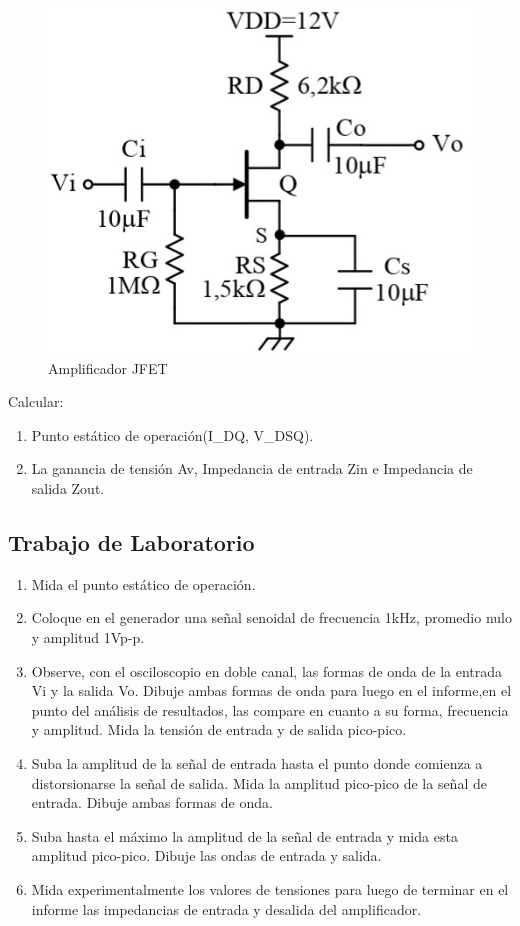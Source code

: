 \documentclass[12pt, a4paper]{article}
\begin{document}
    \begin{figure}[h!]
        \centering
        \includegraphics[height=5cm\textwidth]{amplificador.jpg}
        \caption{Amplificador JFET}
        \label{fig:amp}
    \end{figure}

    Calcular:

    \begin{enumerate}
        \item \label{p11}	Punto estático de operación(I_{DQ}, V_{DSQ}).
        \item \label{p12}	La ganancia de tensión Av, Impedancia de entrada Zin e Impedancia de salida Zout.
    \end{enumerate}

    \subsection{Trabajo de Laboratorio}

    \begin{enumerate}
        \item \label{p21}   Mida el punto estático de operación.
        \item \label{p22}	Coloque en el generador una señal senoidal de frecuencia 1kHz, promedio nulo y amplitud 1Vp-p.
        \item \label{p23} 	Observe, con el osciloscopio en doble canal, las formas de onda de la entrada Vi y la salida Vo. Dibuje ambas formas de onda para luego en el informe,en el punto del análisis de resultados, las compare en cuanto a su forma, frecuencia y amplitud. Mida la tensión de entrada y de salida pico-pico.
        \item \label{p24} 	Suba la amplitud de la señal de entrada hasta el punto donde comienza a distorsionarse la señal de salida. Mida la amplitud pico-pico de la señal de entrada. Dibuje ambas formas de onda.
        \item \label{p25} 	Suba hasta el máximo la amplitud de la señal de entrada y mida esta amplitud pico-pico. Dibuje las ondas de entrada y salida.
        \item \label{p26} Mida experimentalmente los valores de tensiones para luego de terminar en el informe las impedancias de entrada y desalida del amplificador.
    \end{enumerate}
\end{document}
